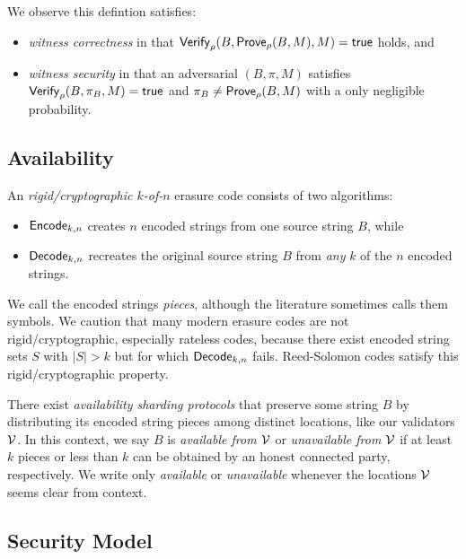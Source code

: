We observe this defintion satisfies:
\begin{itemize}
\item {\em witness correctness} in that $\mathsf{Verify}_{\rho}(B,\mathsf{Prove}_{\rho}(B,M),M) = \mathsf{true}$ holds, and
\item {\em witness security} in that an adversarial $(B,\pi,M)$ satisfies $\mathsf{Verify}_{\rho}(B,\pi_B,M) = \mathsf{true}$ and $\pi_B \ne \mathsf{Prove}_{\rho}(B,M)$ with a only negligible probability.
\end{itemize}

\subsection{Availability}

An {\em rigid/cryptographic $k$-of-$n$} erasure code consists of two algorithms:
\begin{itemize}
\item $\mathsf{Encode}_{k,n}$ creates $n$ encoded strings from one source string $B$, while
\item $\mathsf{Decode}_{k,n}$ recreates the original source string $B$ from {\em any} $k$ of the $n$ encoded strings.
\end{itemize}
We call the encoded strings {\em pieces}, although the literature sometimes calls them symbols.  We caution that many modern erasure codes are not rigid/cryptographic, especially rateless codes, because there exist encoded string sets $S$ with $|S| > k$ but for which $\mathsf{Decode}_{k,n}$ fails.  Reed-Solomon codes satisfy this rigid/cryptographic property.

There exist {\em availability sharding protocols} that preserve some string $B$ by distributing its encoded string pieces among distinct locations, like our validators $\mathcal{V}$.  In this context, we say $B$ is {\em available from $\mathcal{V}$} or {\em unavailable from $\mathcal{V}$} if at least $k$ pieces or less than $k$ can be obtained by an honest connected party, respectively.  We write only  {\em available} or {\em unavailable} whenever the locations $\mathcal{V}$ seems clear from context.



\subsection{Security Model}

